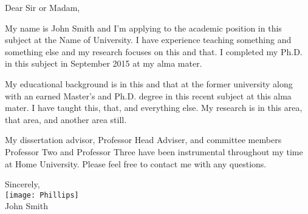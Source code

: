 \documentclass[letterpaper,11pt,oneside]{article}
\begin{document}
\vspace{2em}

Dear Sir or Madam, \\

\vspace{1em}
\onehalfspacing

My name is John Smith and I'm applying to the academic position in this subject at the Name of University. I have experience teaching something and something else and my research focuses on this and that. I completed my Ph.D. in this subject in September 2015 at my alma mater.

\vspace{1em}

My educational background is in this and that at the former university along with an earned Master's and Ph.D. degree in this recent subject at this alma mater. I have taught this, that, and everything else. My research is in this area, that area, and another area still.

\vspace{1em}

My dissertation advisor, Professor Head Adviser, and committee members Professor Two and Professor Three have been instrumental throughout my time at Home University. Please feel free to contact me with any questions.

\vspace{1em}

\begin{flushright}
Sincerely, \\
\vspace{1em} 
\texttt{[image: Phillips]} \\ %
\vspace{1em} 
John Smith \\
\end{flushright}
\end{document}
